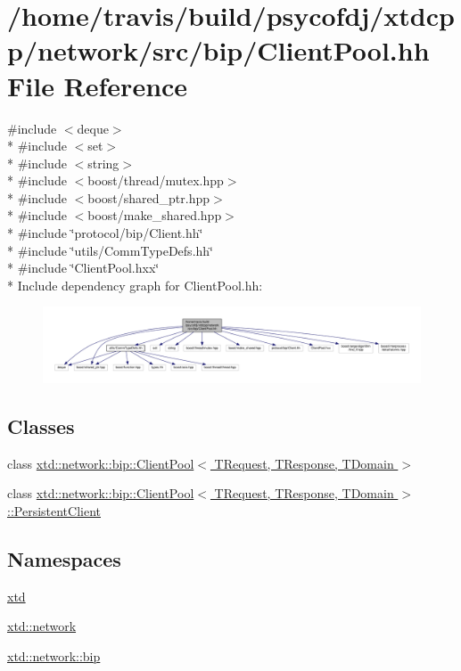 \hypertarget{ClientPool_8hh}{\section{/home/travis/build/psycofdj/xtdcpp/network/src/bip/\-Client\-Pool.hh File Reference}
\label{ClientPool_8hh}
}
{\ttfamily \#include $<$deque$>$}\\*
{\ttfamily \#include $<$set$>$}\\*
{\ttfamily \#include $<$string$>$}\\*
{\ttfamily \#include $<$boost/thread/mutex.\-hpp$>$}\\*
{\ttfamily \#include $<$boost/shared\-\_\-ptr.\-hpp$>$}\\*
{\ttfamily \#include $<$boost/make\-\_\-shared.\-hpp$>$}\\*
{\ttfamily \#include \char`\"{}protocol/bip/\-Client.\-hh\char`\"{}}\\*
{\ttfamily \#include \char`\"{}utils/\-Comm\-Type\-Defs.\-hh\char`\"{}}\\*
{\ttfamily \#include \char`\"{}Client\-Pool.\-hxx\char`\"{}}\\*
Include dependency graph for Client\-Pool.\-hh\-:
\nopagebreak
\begin{figure}[H]
\begin{center}
\leavevmode
\includegraphics[width=350pt]{ClientPool_8hh__incl}
\end{center}
\end{figure}
\subsection*{Classes}
\begin{DoxyCompactItemize}
\item 
class \hyperlink{classxtd_1_1network_1_1bip_1_1ClientPool}{xtd\-::network\-::bip\-::\-Client\-Pool$<$ T\-Request, T\-Response, T\-Domain $>$}
\item 
class \hyperlink{classxtd_1_1network_1_1bip_1_1ClientPool_1_1PersistentClient}{xtd\-::network\-::bip\-::\-Client\-Pool$<$ T\-Request, T\-Response, T\-Domain $>$\-::\-Persistent\-Client}
\end{DoxyCompactItemize}
\subsection*{Namespaces}
\begin{DoxyCompactItemize}
\item 
\hyperlink{namespacextd}{xtd}
\item 
\hyperlink{namespacextd_1_1network}{xtd\-::network}
\item 
\hyperlink{namespacextd_1_1network_1_1bip}{xtd\-::network\-::bip}
\end{DoxyCompactItemize}
